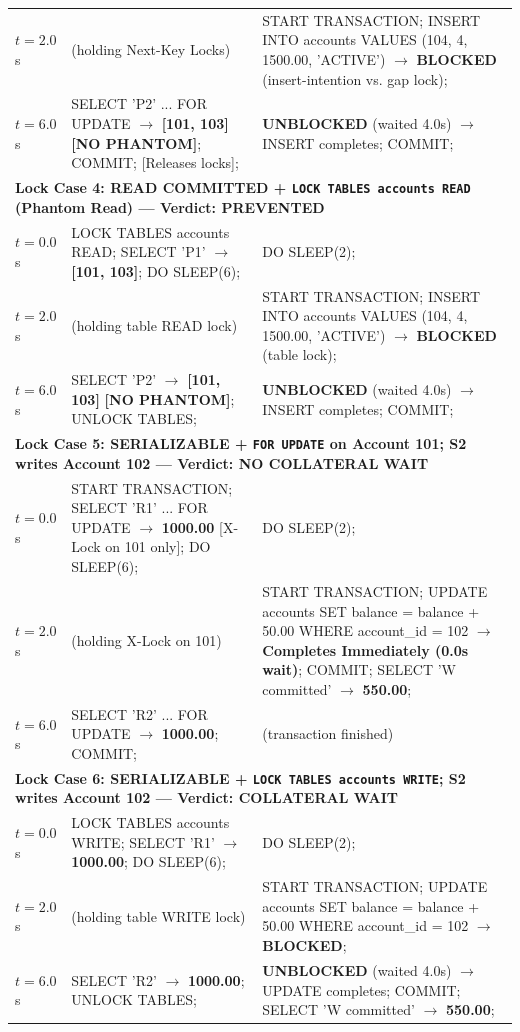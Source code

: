 \documentclass[sigconf, pbalance, nonacm]{acmart}
\begin{document}
\begin{table}[p]
\begin{tabularx}{\textwidth}{p{1.8cm} X X}
$t = 2.0$s & (holding Next-Key Locks) & START TRANSACTION; INSERT INTO accounts VALUES (104, 4, 1500.00, 'ACTIVE') $\rightarrow$ \textbf{BLOCKED} (insert-intention vs. gap lock); \\
$t = 6.0$s & SELECT 'P2' ... FOR UPDATE $\rightarrow$ \textbf{[101, 103]} \textbf{[NO PHANTOM]}; COMMIT; [Releases locks]; & \textbf{UNBLOCKED} (waited 4.0s) $\rightarrow$ INSERT completes; COMMIT; \\
\midrule
\multicolumn{3}{l}{\textbf{Lock Case 4: READ COMMITTED + \texttt{LOCK TABLES accounts READ} (Phantom Read) --- Verdict: PREVENTED}} \\
$t = 0.0$s & LOCK TABLES accounts READ; SELECT 'P1' $\rightarrow$ \textbf{[101, 103]}; DO SLEEP(6); & DO SLEEP(2); \\
$t = 2.0$s & (holding table READ lock) & START TRANSACTION; INSERT INTO accounts VALUES (104, 4, 1500.00, 'ACTIVE') $\rightarrow$ \textbf{BLOCKED} (table lock); \\
$t = 6.0$s & SELECT 'P2' $\rightarrow$ \textbf{[101, 103]} \textbf{[NO PHANTOM]}; UNLOCK TABLES; & \textbf{UNBLOCKED} (waited 4.0s) $\rightarrow$ INSERT completes; COMMIT; \\
\midrule
\multicolumn{3}{l}{\textbf{Lock Case 5: SERIALIZABLE + \texttt{FOR UPDATE} on Account 101; S2 writes Account 102 --- Verdict: NO COLLATERAL WAIT}} \\
$t = 0.0$s & START TRANSACTION; SELECT 'R1' ... FOR UPDATE $\rightarrow$ \textbf{1000.00} [X-Lock on 101 only]; DO SLEEP(6); & DO SLEEP(2); \\
$t = 2.0$s & (holding X-Lock on 101) & START TRANSACTION; UPDATE accounts SET balance = balance + 50.00 WHERE account\_id = 102 $\rightarrow$ \textbf{Completes Immediately (0.0s wait)}; COMMIT; SELECT 'W committed' $\rightarrow$ \textbf{550.00}; \\
$t = 6.0$s & SELECT 'R2' ... FOR UPDATE $\rightarrow$ \textbf{1000.00}; COMMIT; & (transaction finished) \\
\midrule
\multicolumn{3}{l}{\textbf{Lock Case 6: SERIALIZABLE + \texttt{LOCK TABLES accounts WRITE}; S2 writes Account 102 --- Verdict: COLLATERAL WAIT}} \\
$t = 0.0$s & LOCK TABLES accounts WRITE; SELECT 'R1' $\rightarrow$ \textbf{1000.00}; DO SLEEP(6); & DO SLEEP(2); \\
$t = 2.0$s & (holding table WRITE lock) & START TRANSACTION; UPDATE accounts SET balance = balance + 50.00 WHERE account\_id = 102 $\rightarrow$ \textbf{BLOCKED}; \\
$t = 6.0$s & SELECT 'R2' $\rightarrow$ \textbf{1000.00}; UNLOCK TABLES; & \textbf{UNBLOCKED} (waited 4.0s) $\rightarrow$ UPDATE completes; COMMIT; SELECT 'W committed' $\rightarrow$ \textbf{550.00}; \\
\bottomrule
\end{tabularx}
\end{table}
\end{document}
